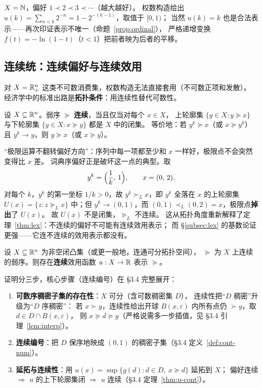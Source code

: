 \begin{example}[无限阶梯]
$X=\mathbb{N}$，偏好 $1\prec 2\prec 3\prec\cdots$（越大越好）。
权数构造给出 $u(k)=\sum_{n<k}2^{-n}=1-2^{-(k-1)}$，取值于 $[0,1)$；
当然 $u(k)=k$ 也是合法表示——再次印证表示不唯一（命题~\ref{prop:ordinal}），
严格递增变换 $f(t)=-\ln(1-t)$（$t<1$）把前者映为后者的平移。
\end{example}

\subsection{连续统：连续偏好与连续效用}

对 $X=\mathbb{R}^n_+$ 这类不可数消费集，权数构造无法直接套用（不可数正项和发散）。
经济学中的标准出路是\textbf{拓扑条件}：用连续性替代可数性。

\begin{definition}[连续偏好]\label{def:cont-pref}
设 $X\subseteq\mathbb{R}^n$。弱序 $\succeq$ \textbf{连续}，当且仅当对每个 $x\in X$，
上轮廓集 $\{y\in X:y\succeq x\}$ 与下轮廓集 $\{y\in X:x\succeq y\}$ 都是 $X$ 中的闭集。
等价地：若 $y^k\succeq x$（或 $x\succeq y^k$）且 $y^k\to y$，则 $y\succeq x$（或 $x\succeq y$）。
\end{definition}

\begin{remark}[连续性的序含义]
“极限运算不翻转偏好方向”：序列中每一项都至少和 $x$ 一样好，极限点不会突然变得比 $x$ 差。
词典序偏好正是破坏这一点的典型。取
\[
y^k=\Bigl(\frac{1}{k},\,1\Bigr),\qquad x=(0,\,2).
\]
对每个 $k$，$y^k$ 的第一坐标 $1/k>0$，故 $y^k\succ_L x$，即 $y^k$ 全落在 $x$ 的上轮廓集
$U(x)=\{z:z\succeq_L x\}$ 中；但 $y^k\to(0,1)$，而 $(0,1)\prec_L(0,2)=x$，极限点\textbf{掉出}了 $U(x)$。
故 $U(x)$ 不是闭集，$\succeq_L$ 不连续。
这从拓扑角度重新解释了定理~\ref{thm:lex}：不连续的偏好不可能有连续效用表示；
而 §\ref{subsec:lex} 的基数论证更强——它连不连续的效用表示都没有。
\end{remark}

\begin{theorem}[连续偏好的效用表示定理]\label{thm:continuous-rep}
设 $X\subseteq\mathbb{R}^n$ 为非空闭凸集（或更一般地，连通可分拓扑空间），
$\succeq$ 为 $X$ 上连续的弱序。则存在\textbf{连续}效用函数 $u:X\to\mathbb{R}$ 表示 $\succeq$。
\end{theorem}

证明分三步，核心步骤（连续编号）在 §3.4 完整展开：

\begin{enumerate}
  \item \textbf{可数序稠密子集的存在性}：$X$ 可分（含可数稠密集 $D$），
        连续性把“$D$ 稠密”升级为“$D$ 序稠密”：
        若 $x\succ y$，连续性给出开球 $B(x,\varepsilon)$ 内所有点仍 $\succ y$，取 $d\in D\cap B(x,\varepsilon)$，
        则 $x\succeq d\succeq y$（严格说需多一步插值，见 §3.4 引理~\ref{lem:interp}）。
  \item \textbf{连续编号}：把 $D$ 保序地映成 $(0,1)$ 的稠密子集（§3.4 定义~\ref{def:cont-num}）。
  \item \textbf{延拓与连续性}：用 $u(x)=\sup\{g(d):d\in D,\ x\succeq d\}$ 延拓到 $X$；
        偏好连续 $\Rightarrow$ $u$ 的上下轮廓集闭 $\Rightarrow$ $u$ 连续（§3.4 定理~\ref{thm:u-cont}）。
\end{enumerate}


